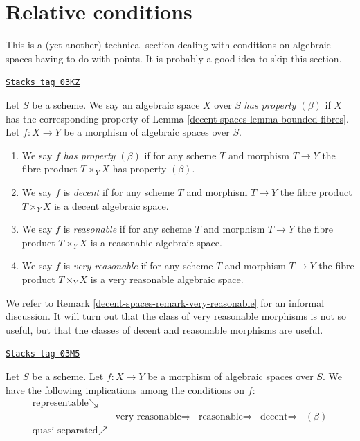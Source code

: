 \section{Relative conditions}
\label{decent-spaces-section-relative-conditions}
This is a (yet another) technical section dealing with conditions on
algebraic spaces having to do with points. It is probably a good idea
to skip this section.

\begin{definition}
\label{decent-spaces-definition-relative-conditions}
\href{https://stacks.math.columbia.edu/tag/03KZ}{\texttt{Stacks tag 03KZ}}

Let $S$ be a scheme. We say an algebraic space $X$ over $S$
{\it has property $(\beta)$} if $X$ has the corresponding property of
Lemma \ref{decent-spaces-lemma-bounded-fibres}.
Let $f : X \to Y$ be a morphism of algebraic spaces over $S$.
\begin{enumerate}
\item We say $f$ {\it has property $(\beta)$} if for any scheme $T$ and
morphism $T \to Y$ the fibre product $T \times_Y X$ has property $(\beta)$.
\item We say $f$ is {\it decent} if for any scheme $T$ and
morphism $T \to Y$ the fibre product $T \times_Y X$ is a decent
algebraic space.
\item We say $f$ is {\it reasonable} if for any scheme $T$ and
morphism $T \to Y$ the fibre product $T \times_Y X$ is a reasonable
algebraic space.
\item We say $f$ is {\it very reasonable} if for any scheme $T$ and
morphism $T \to Y$ the fibre product $T \times_Y X$ is a very reasonable
algebraic space.
\end{enumerate}
\end{definition}

We refer to Remark \ref{decent-spaces-remark-very-reasonable} for an informal discussion.
It will turn out that the class of very reasonable morphisms is not so
useful, but that the classes of decent and reasonable morphisms are useful.

\begin{lemma}
\label{decent-spaces-lemma-properties-trivial-implications}
\href{https://stacks.math.columbia.edu/tag/03M5}{\texttt{Stacks tag 03M5}}

Let $S$ be a scheme.
Let $f : X \to Y$ be a morphism of algebraic spaces over $S$.
We have the following implications among the conditions on $f$:
$$
\begin{array}{ccccc}\text{representable} \searrow &  &  &  &  \\  & \text{very reasonable} \Longrightarrow & \text{reasonable} \Longrightarrow & \text{decent} \Longrightarrow & (\beta) \\ \text{quasi-separated} \nearrow &  &  &  & \end{array}
$$
\end{lemma}

